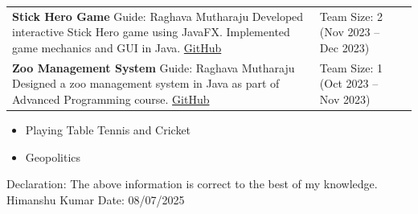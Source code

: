 \documentclass[10pt]{extarticle}
\begin{document}
\begin{contained}
\begin{longtable}{p{}p{}p{}}
    \textbf{Stick Hero Game} \newline
    Guide: Raghava Mutharaju \newline
    Developed interactive Stick Hero game using JavaFX. Implemented game mechanics and GUI in Java.
    \newline \href{https://github.com/Himanshu8368/Ap-Project}{GitHub} &
    Team Size: 2 \newline (Nov 2023 – Dec 2023)\\

    \textbf{Zoo Management System} \newline
    Guide: Raghava Mutharaju \newline
    Designed a zoo management system in Java as part of Advanced Programming course.
    \newline \href{https://github.com/yourusername/zoo-management}{GitHub} &
    Team Size: 1 \newline (Oct 2023 – Nov 2023)\\

\end{longtable}
\end{contained}

\begin{contained}
\begin{itemize}
    \item Playing Table Tennis and Cricket
    \item Geopolitics
\end{itemize}
\end{contained}
\vspace{10pt}
Declaration: The above information is correct to the best of my knowledge.\newline
Himanshu Kumar\newline
Date: 08/07/2025
\end{document}
